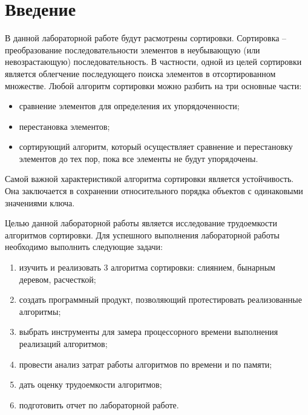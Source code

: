 \chapter*{Введение}

В данной лабораторной работе будут расмотрены сортировки.
Сортировка -- преобразование последовательности элементов в неубывающую (или невозрастающую) последовательность\cite{definition}. 
В частности, одной из целей сортировки является облегчение последующего поиска элементов в отсортированном множестве.
Любой алгоритм сортировки можно разбить на три основные части:

\begin{itemize}
	\item сравнение элементов для определения их упорядоченности;
	\item перестановка элементов;
	\item сортирующий алгоритм, который осуществляет сравнение и перестановку элементов до тех пор, пока все элементы не будут упорядочены.
\end{itemize}

Самой важной характеристикой алгоритма сортировки является устойчивость.
Она заключается в сохранении относительного порядка объектов с одинаковыми значениями ключа.

Целью данной лабораторной работы является исследование трудоемкости алгоритмов сортировки. 
Для успешного выполнения лабораторной работы необходимо выполнить следующие задачи: 

\begin{enumerate}[label={\arabic*)}]
	\item изучить и реализовать 3 алгоритма сортировки: слиянием, бынарным деревом, расчесткой;
	\item создать программный продукт, позволяющий протестировать реализованные алгоритмы;
	\item выбрать инструменты для замера процессорного времени выполнения реализаций алгоритмов;
	\item провести анализ затрат работы алгоритмов по времени и по памяти;
	\item дать оценку трудоемкости алгоритмов;
	\item подготовить отчет по лабораторной работе.
\end{enumerate}